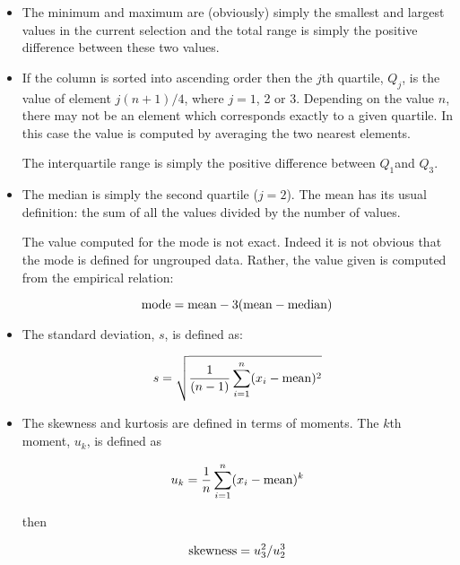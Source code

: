\documentclass[twoside,11pt]{article}
\renewcommand{\_}{\texttt{\symbol{95}}}
\begin{document}
\begin{itemize}

  \item The minimum and maximum are (obviously) simply the smallest and
   largest values in the current selection and the total range is simply
   the positive difference between these two values.

  \item If the column is sorted into ascending order then the $j$th quartile,
   $Q_{j}$, is the value of element $j(n + 1)/4$, where $j = 1$, 2 or 3.
   Depending on the value $n$, there may not be an element which
   corresponds exactly to a given quartile.  In this case the value is
   computed by averaging the two nearest elements.

   The interquartile range is simply the positive difference between
   $Q_{1}$and $Q_{3}$.

  \item The median is simply the second quartile ($j = 2$).  The mean has
   its usual definition: the sum of all the values divided by the number
   of values.

   The value computed for the mode is not exact.  Indeed it is not
   obvious that the mode is defined for ungrouped data.  Rather, the value
   given is computed from the empirical relation:

  \begin{equation}
   {\rm mode} = {\rm mean} - 3({\rm mean} - {\rm median})
  \end{equation}

  \item The standard deviation, $s$, is defined as:


  \begin{equation}
   s = \sqrt{ \frac{1}{(n - 1)} \sum_{i=1}^{n} (x_{i} - {\rm mean})^2 }
  \end{equation}

  \item The skewness and kurtosis are defined in terms of moments.  The
   $k$th moment, $u_{k}$, is defined as

  \begin{equation}
   u_{k} = \frac{1}{n} \sum_{i=1}^{n} (x_{i} - {\rm mean})^{k}
  \end{equation}

   then

  \begin{equation}
   {\rm skewness} = u_{3}^{2} / u_{2}^{3}
  \end{equation}


\end{itemize}
\end{document}
